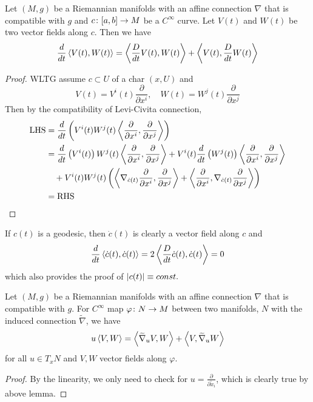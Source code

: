 \begin{enumerate}[label=\arabic{*}.]
	\begin{lem}
		Let $(M,g)$ be a Riemannian manifolds with an affine connection $\nabla$ that is compatible with $g$ and $c \colon [a,b] \rightarrow M$ be a $C^\infty$ curve. Let $V(t)$ and $W(t)$ be two vector fields along $c$. Then we have
		\begin{equation*}
			\frac{d}{dt}\left\langle V(t),W(t) \right\rangle = \left\langle \frac{D}{dt}V(t),W(t) \right\rangle +\left\langle V(t),\frac{D}{dt}W(t) \right\rangle
		\end{equation*}
	\end{lem}
	\begin{proof}
		WLTG assume $c \subset U$ of a char $(x,U)$ and 
		\begin{equation*}
			V(t) = V^i(t)\frac{\partial}{\partial x^i},\quad W(t) = W^j(t)\frac{\partial}{\partial x^j}
		\end{equation*}
		Then  by the compatibility of Levi-Civita connection, 
		\begin{equation*}
			\begin{aligned}
				\text{LHS}&=\frac{d}{dt}\left(V^i(t)W^j(t)\left\langle \frac{\partial}{\partial x^i},\frac{\partial}{\partial x^j} \right\rangle\right)\\
				&=\frac{d}{dt}\left(V^i(t)\right)W^j(t)\left\langle \frac{\partial}{\partial x^i},\frac{\partial}{\partial x^j} \right\rangle + V^i(t)\frac{d}{dt}\left(W^j(t)\right)\left\langle \frac{\partial}{\partial x^i},\frac{\partial}{\partial x^j} \right\rangle \\
				&\quad + V^i(t)W^j(t)\left(\left\langle \nabla_{\dot{c}(t)}\frac{\partial}{\partial x^i},\frac{\partial}{\partial x^j} \right\rangle+\left\langle \frac{\partial}{\partial x^i},\nabla_{\dot{c}(t)}\frac{\partial}{\partial x^j} \right\rangle\right) \\
				&= \text{RHS}
			\end{aligned}
		\end{equation*}
	\end{proof}
	\begin{rmk}
		If $c(t)$ is a geodesic, then $\dot{c}(t)$ is clearly a vector field along $c$ and
		\begin{equation*}
			\frac{d}{dt}\left\langle \dot{c}(t),\dot{c}(t) \right\rangle = 2\left\langle \frac{D}{dt}\dot{c}(t),\dot{c}(t) \right\rangle = 0
		\end{equation*}
		which also provides the proof of $\left\lvert c(t)\right\lvert \equiv const.$
	\end{rmk}

	\begin{prop}
		Let $(M,g)$ be a Riemannian manifolds with an affine connection $\nabla$ that is compatible with $g$. For $C^\infty$ map $\varphi \colon N \rightarrow M$ between two manifolds, $N$ with the induced connection $\widetilde{\nabla}$, we have
		\begin{equation*}
			u\left\langle V,W \right\rangle = \left\langle \widetilde{\nabla}_uV,W \right\rangle+\left\langle V,\widetilde{\nabla}_uW \right\rangle
		\end{equation*}
		for all $u \in T_xN$ and $V,W$ vector fields along $\varphi$.
	\end{prop}
	\begin{proof}
		By the linearity, we only need to check for $u = \frac{\partial}{\partial \tilde{x}_i}$, which is clearly true by above lemma.
	\end{proof}


\end{enumerate}
